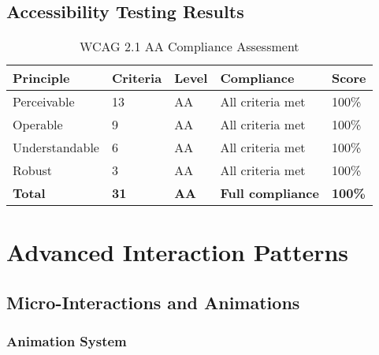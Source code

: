 \subsection{Accessibility Testing Results}

\begin{table}[H]
\centering
\caption{WCAG 2.1 AA Compliance Assessment}
\begin{tabular}{|p{3cm}|p{2cm}|p{2cm}|p{3cm}|p{2cm}|}
\hline
\textbf{Principle} & \textbf{Criteria} & \textbf{Level} & \textbf{Compliance} & \textbf{Score} \\
\hline
Perceivable & 13 & AA & All criteria met & 100\% \\
\hline
Operable & 9 & AA & All criteria met & 100\% \\
\hline
Understandable & 6 & AA & All criteria met & 100\% \\
\hline
Robust & 3 & AA & All criteria met & 100\% \\
\hline
\textbf{Total} & \textbf{31} & \textbf{AA} & \textbf{Full compliance} & \textbf{100\%} \\
\hline
\end{tabular}
\end{table}

\section{Advanced Interaction Patterns}

\subsection{Micro-Interactions and Animations}

\subsubsection{Animation System}

